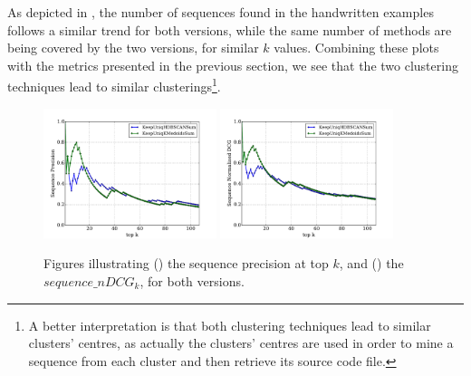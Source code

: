 As depicted in , the number of sequences found in the handwritten examples follows a similar trend for both versions, while the same number of methods are being covered by the two versions, for similar $k$ values. Combining these plots with the metrics presented in the previous section, we see that the two clustering techniques lead to similar clusterings\footnote{A better interpretation is that both clustering techniques lead to similar clusters' centres, as actually the clusters' centres are used in order to mine a sequence from each cluster and then retrieve its source code file.}.

\begin{figure}
\ffigbox
{%
  \begin{subfloatrow}[2]
  \ffigbox[\FBwidth]
    {\caption{}\label{res:exp3-sequence-precision}}
    {\includegraphics[width=0.45\textwidth]{results/exp3-sequence-precision.pdf}}
  \hspace{1em}%
  \ffigbox[\FBwidth]
    {\caption{}\label{res:exp3-sequence-ndcg}}
    {\includegraphics[width=0.45\textwidth]{results/exp3-sequence-ndcg.pdf}}
  \end{subfloatrow}}
  {\caption[Illustration of the precision at top $k$, and the $nDCG_k$ metrics\protect\\($KeepUniqKMedoidsSum$, $KeepUniqHDBSCANSum$)]{Figures illustrating () the sequence precision at top $k$, and () the $sequence\_nDCG_k$, for both versions.}
\label{res:exp3-precision-ndcg}}
\end{figure}

